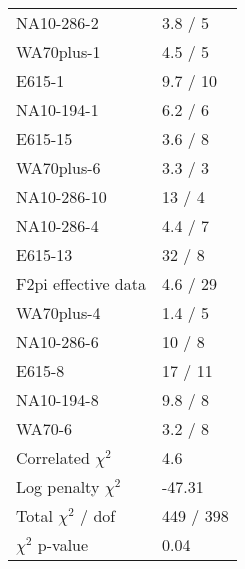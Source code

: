 \documentclass[14pt]{report}
\begin{document}
\begin{table}
\begin{center}
{\begin{tabular}{lp{2.57cm}}
  NA10-286-2 & 3.8 / 5  \\ 
  WA70plus-1 & 4.5 / 5  \\ 
  E615-1 & 9.7 / 10  \\ 
  NA10-194-1 & 6.2 / 6  \\ 
  E615-15 & 3.6 / 8  \\ 
  WA70plus-6 & 3.3 / 3  \\ 
  NA10-286-10 & 13 / 4  \\ 
  NA10-286-4 & 4.4 / 7  \\ 
  E615-13 & 32 / 8  \\ 
  F2pi effective data & 4.6 / 29  \\ 
  WA70plus-4 & 1.4 / 5  \\ 
  NA10-286-6 & 10 / 8  \\ 
  E615-8 & 17 / 11  \\ 
  NA10-194-8 & 9.8 / 8  \\ 
  WA70-6 & 3.2 / 8  \\ 
  Correlated $\chi^2$  & 4.6  \\ 
  Log penalty $\chi^2$  & -47.31  \\ 
  \rowcolor{white}
      \midrule
  Total $\chi^2$ / dof  & 449 / 398  \\ 
  \rowcolor{white}
      \midrule
  $\chi^2$ p-value  & 0.04   \\ 
      \bottomrule
    \end{tabular}
  }
  \end{center}
\end{table}
\end{document}
